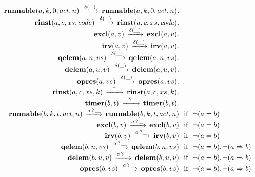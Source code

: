 \[\begin{array}{r@{}c@{}llllll}
\\\Pfact{\Tstep{\Trunnable{\Tvar{A}}{\Tvar{K}}{0}{\Tvar{Act}}{\Tvar{N}}}{\Tdelta{\_}}{\Trunnable{\Tvar{A}}{\Tvar{K}}{0}{\Tvar{Act}}{\Tvar{N}}}}
\\\Pfact{\Tstep{\Trinst{\Tvar{A}}{\Tvar{C}}{\Tvar{Xs}}{\Tvar{Code}}}{\Tdelta{\_}}{\Trinst{\Tvar{A}}{\Tvar{C}}{\Tvar{Xs}}{\Tvar{Code}}}}
\\\Pfact{\Tstep{\Texcl{\Tvar{A}}{\Tvar{V}}}{\Tdelta{\_}}{\Texcl{\Tvar{A}}{\Tvar{V}}}}
\\\Pfact{\Tstep{\Tirv{\Tvar{A}}{\Tvar{V}}}{\Tdelta{\_}}{\Tirv{\Tvar{A}}{\Tvar{V}}}}
\\\Pfact{\Tstep{\Tqelem{\Tvar{A}}{\Tvar{N}}{\Tvar{Vs}}}{\Tdelta{\_}}{\Tqelem{\Tvar{A}}{\Tvar{N}}{\Tvar{Vs}}}}
\\\Pfact{\Tstep{\Tdelem{\Tvar{A}}{\Tvar{U}}{\Tvar{V}}}{\Tdelta{\_}}{\Tdelem{\Tvar{A}}{\Tvar{U}}{\Tvar{V}}}}
\\\Pfact{\Tstep{\Topres{\Tvar{A}}{\Tvar{Vs}}}{\Tdelta{\_}}{\Topres{\Tvar{A}}{\Tvar{Vs}}}}
\\\Pfact{\Tstep{\Trinst{\Tvar{A}}{\Tvar{C}}{\Tvar{Xs}}{\Tvar{K}}}{\Thear{\_}{\_}}{\Trinst{\Tvar{A}}{\Tvar{C}}{\Tvar{Xs}}{\Tvar{K}}}}
\\\Pfact{\Tstep{\Ttimer{\Tvar{B}}{\Tvar{T}}}{\Thear{\_}{\_}}{\Ttimer{\Tvar{B}}{\Tvar{T}}}}
\\\Prule{\Tstep{\Trunnable{\Tvar{B}}{\Tvar{K}}{\Tvar{T}}{\Tvar{Act}}{\Tvar{N}}}{\Thear{\Tvar{A}}{\_}}{\Trunnable{\Tvar{B}}{\Tvar{K}}{\Tvar{T}}{\Tvar{Act}}{\Tvar{N}}}}{\Pnegate{\Tequal{\Tvar{A}}{\Tvar{B}}}}
\\\Prule{\Tstep{\Texcl{\Tvar{B}}{\Tvar{V}}}{\Thear{\Tvar{A}}{\_}}{\Texcl{\Tvar{B}}{\Tvar{V}}}}{\Pnegate{\Tequal{\Tvar{A}}{\Tvar{B}}}}
\\\Prule{\Tstep{\Tirv{\Tvar{B}}{\Tvar{V}}}{\Thear{\Tvar{A}}{\_}}{\Tirv{\Tvar{B}}{\Tvar{V}}}}{\Pnegate{\Tequal{\Tvar{A}}{\Tvar{B}}}}
\\\Prule{\Tstep{\Tqelem{\Tvar{B}}{\Tvar{N}}{\Tvar{Vs}}}{\Thear{\Tvar{A}}{\_}}{\Tqelem{\Tvar{B}}{\Tvar{N}}{\Tvar{Vs}}}}{\Pnegate{\Tequal{\Tvar{A}}{\Tvar{B}}},\Pnegate{\Tconnect{\Tvar{A}}{\Tvar{B}}}}
\\\Prule{\Tstep{\Tdelem{\Tvar{B}}{\Tvar{U}}{\Tvar{V}}}{\Thear{\Tvar{A}}{\_}}{\Tdelem{\Tvar{B}}{\Tvar{U}}{\Tvar{V}}}}{\Pnegate{\Tequal{\Tvar{A}}{\Tvar{B}}},\Pnegate{\Tconnect{\Tvar{A}}{\Tvar{B}}}}
\\\Prule{\Tstep{\Topres{\Tvar{B}}{\Tvar{Vs}}}{\Thear{\Tvar{A}}{\_}}{\Topres{\Tvar{B}}{\Tvar{Vs}}}}{\Pnegate{\Tequal{\Tvar{A}}{\Tvar{B}}},\Pnegate{\Tconnect{\Tvar{A}}{\Tvar{B}}}}
\\\end{array}
\]
